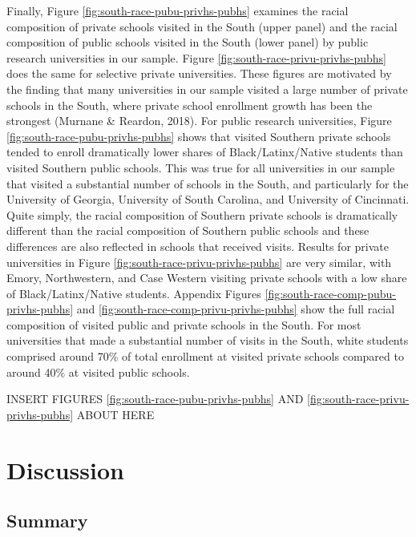 \documentclass[
  12pt,
]{article}
\begin{document}
Finally, Figure \ref{fig:south-race-pubu-privhs-pubhs} examines the racial composition of private schools visited in the South (upper panel) and the racial composition of public schools visited in the South (lower panel) by public research universities in our sample. Figure \ref{fig:south-race-privu-privhs-pubhs} does the same for selective private universities. These figures are motivated by the finding that many universities in our sample visited a large number of private schools in the South, where private school enrollment growth has been the strongest (Murnane \& Reardon, 2018). For public research universities, Figure \ref{fig:south-race-pubu-privhs-pubhs} shows that visited Southern private schools tended to enroll dramatically lower shares of Black/Latinx/Native students than visited Southern public schools. This was true for all universities in our sample that visited a substantial number of schools in the South, and particularly for the University of Georgia, University of South Carolina, and University of Cincinnati. Quite simply, the racial composition of Southern private schools is dramatically different than the racial composition of Southern public schools and these differences are also reflected in schools that received visits. Results for private universities in Figure \ref{fig:south-race-privu-privhs-pubhs} are very similar, with Emory, Northwestern, and Case Western visiting private schools with a low share of Black/Latinx/Native students. Appendix Figures \ref{fig:south-race-comp-pubu-privhs-pubhs} and \ref{fig:south-race-comp-privu-privhs-pubhs} show the full racial composition of visited public and private schools in the South. For most universities that made a substantial number of visits in the South, white students comprised around 70\% of total enrollment at visited private schools compared to around 40\% at visited public schools.

INSERT FIGURES \ref{fig:south-race-pubu-privhs-pubhs} AND \ref{fig:south-race-privu-privhs-pubhs} ABOUT HERE

\hypertarget{discussion}{%
\section{Discussion}\label{discussion}}

\hypertarget{summary}{%
\subsection{Summary}\label{summary}}
\end{document}
